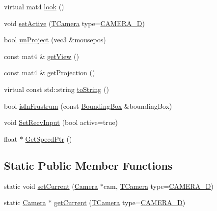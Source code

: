 \begin{DoxyCompactItemize}
\item 
virtual mat4 \hyperlink{class_agmd_1_1_camera_a467e8b41237023bfd77203545c410425}{look} ()
\item 
void \hyperlink{class_agmd_1_1_camera_ad37eaa4330e7e23629686822ac1c6a0f}{set\+Active} (\hyperlink{namespace_agmd_ae9cf2069b16400fdecd8b6d46194b47a}{T\+Camera} type=\hyperlink{namespace_agmd_ae9cf2069b16400fdecd8b6d46194b47aad688d0f59c096a5c70eeb3b7f4f297b7}{C\+A\+M\+E\+R\+A\+\_\+D})
\item 
bool \hyperlink{class_agmd_1_1_camera_a1c453c10f21d1b1ba1906bb133b1ad0c}{un\+Project} (vec3 \&mousepos)
\item 
const mat4 \& \hyperlink{class_agmd_1_1_camera_a4bddc313f950514a8a8fe991c2d82883}{get\+View} ()
\item 
const mat4 \& \hyperlink{class_agmd_1_1_camera_acca058a1e9397eba745ba138214a4324}{get\+Projection} ()
\item 
virtual const std\+::string \hyperlink{class_agmd_1_1_camera_aa48744d14605a3373cb5dd7ac8170d9f}{to\+String} ()
\item 
bool \hyperlink{class_agmd_1_1_camera_af0b974b19a2a61c4eb4d6a1235988227}{is\+In\+Frustrum} (const \hyperlink{class_agmd_1_1_bounding_box}{Bounding\+Box} \&bounding\+Box)
\item 
void \hyperlink{class_agmd_1_1_camera_ab0a4c20ad834a7c87492b866bce96b7b}{Set\+Recv\+Input} (bool active=true)
\item 
float $\ast$ \hyperlink{class_agmd_1_1_camera_a8f34d5daef5fed69da848efd4a2fb51f}{Get\+Speed\+Ptr} ()
\end{DoxyCompactItemize}
\subsection*{Static Public Member Functions}
\begin{DoxyCompactItemize}
\item 
static void \hyperlink{class_agmd_1_1_camera_ad50fb3a8ed9a15b74418d27fe7c284c3}{set\+Current} (\hyperlink{class_agmd_1_1_camera}{Camera} $\ast$cam, \hyperlink{namespace_agmd_ae9cf2069b16400fdecd8b6d46194b47a}{T\+Camera} type=\hyperlink{namespace_agmd_ae9cf2069b16400fdecd8b6d46194b47aad688d0f59c096a5c70eeb3b7f4f297b7}{C\+A\+M\+E\+R\+A\+\_\+D})
\item 
static \hyperlink{class_agmd_1_1_camera}{Camera} $\ast$ \hyperlink{class_agmd_1_1_camera_ad7540ca1559b046eeb41beaffca4c36d}{get\+Current} (\hyperlink{namespace_agmd_ae9cf2069b16400fdecd8b6d46194b47a}{T\+Camera} type=\hyperlink{namespace_agmd_ae9cf2069b16400fdecd8b6d46194b47aad688d0f59c096a5c70eeb3b7f4f297b7}{C\+A\+M\+E\+R\+A\+\_\+D})
\end{DoxyCompactItemize}
